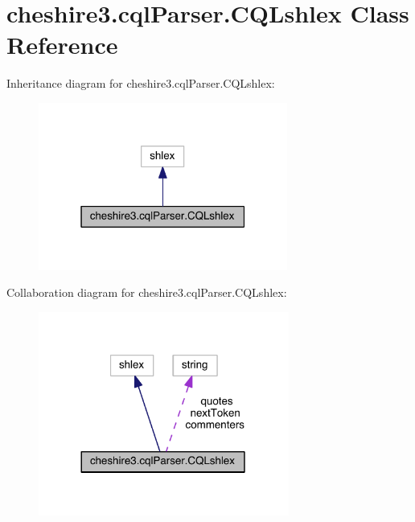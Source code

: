\hypertarget{classcheshire3_1_1cql_parser_1_1_c_q_lshlex}{\section{cheshire3.\-cql\-Parser.\-C\-Q\-Lshlex Class Reference}
\label{classcheshire3_1_1cql_parser_1_1_c_q_lshlex}
}


Inheritance diagram for cheshire3.\-cql\-Parser.\-C\-Q\-Lshlex\-:
\nopagebreak
\begin{figure}[H]
\begin{center}
\leavevmode
\includegraphics[width=232pt]{classcheshire3_1_1cql_parser_1_1_c_q_lshlex__inherit__graph}
\end{center}
\end{figure}


Collaboration diagram for cheshire3.\-cql\-Parser.\-C\-Q\-Lshlex\-:
\nopagebreak
\begin{figure}[H]
\begin{center}
\leavevmode
\includegraphics[width=233pt]{classcheshire3_1_1cql_parser_1_1_c_q_lshlex__coll__graph}
\end{center}
\end{figure}
